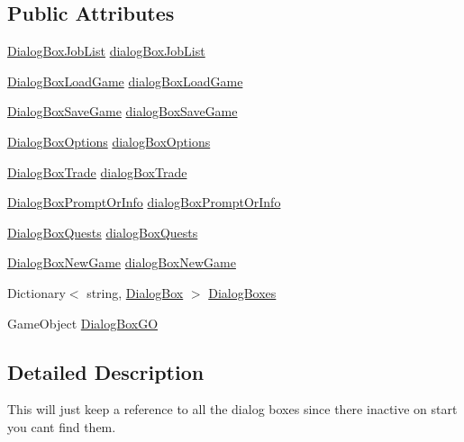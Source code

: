 \subsection*{Public Attributes}
\begin{DoxyCompactItemize}
\item 
\hyperlink{class_dialog_box_job_list}{Dialog\+Box\+Job\+List} \hyperlink{class_dialog_box_manager_ad3e26fa78eba8fb93d1b588c6473f8fb}{dialog\+Box\+Job\+List}
\item 
\hyperlink{class_dialog_box_load_game}{Dialog\+Box\+Load\+Game} \hyperlink{class_dialog_box_manager_a7fe5919b91555cb38f893f68ef6550c8}{dialog\+Box\+Load\+Game}
\item 
\hyperlink{class_dialog_box_save_game}{Dialog\+Box\+Save\+Game} \hyperlink{class_dialog_box_manager_aa12a0227621579833710bc9b66962ceb}{dialog\+Box\+Save\+Game}
\item 
\hyperlink{class_dialog_box_options}{Dialog\+Box\+Options} \hyperlink{class_dialog_box_manager_af6798edfad0b5a28f3d831a76226d236}{dialog\+Box\+Options}
\item 
\hyperlink{class_dialog_box_trade}{Dialog\+Box\+Trade} \hyperlink{class_dialog_box_manager_af9c33f03e3be79d94abfee7d6517bb82}{dialog\+Box\+Trade}
\item 
\hyperlink{class_dialog_box_prompt_or_info}{Dialog\+Box\+Prompt\+Or\+Info} \hyperlink{class_dialog_box_manager_a40e91c5356fd1d8e34c74fc830b02054}{dialog\+Box\+Prompt\+Or\+Info}
\item 
\hyperlink{class_dialog_box_quests}{Dialog\+Box\+Quests} \hyperlink{class_dialog_box_manager_a4f41daee40e58ad03b5ab7033f58d480}{dialog\+Box\+Quests}
\item 
\hyperlink{class_dialog_box_new_game}{Dialog\+Box\+New\+Game} \hyperlink{class_dialog_box_manager_aad5b65c6d885c43cbffe0ae0b1802774}{dialog\+Box\+New\+Game}
\item 
Dictionary$<$ string, \hyperlink{class_dialog_box}{Dialog\+Box} $>$ \hyperlink{class_dialog_box_manager_aee2041e576481fc9baf5bd9b916151b4}{Dialog\+Boxes}
\item 
Game\+Object \hyperlink{class_dialog_box_manager_a028978852d9e4a722141040ee022157e}{Dialog\+Box\+GO}
\end{DoxyCompactItemize}


\subsection{Detailed Description}
This will just keep a reference to all the dialog boxes since there inactive on start you cant find them. 



